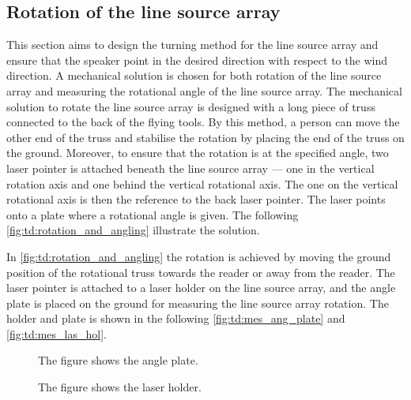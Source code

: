 \subsection{Rotation of the line source array}
This section aims to design the turning method for the line source array and ensure that the speaker point in the desired direction with respect to the wind direction. A mechanical solution is chosen for both rotation of the line source array and measuring the rotational angle of the line source array. The mechanical solution to rotate the line source array is designed with a long piece of truss connected to the back of the flying tools. By this method, a person can move the other end of the truss and stabilise the rotation by placing the end of the truss on the ground. Moreover, to ensure that the rotation is at the specified angle, two laser pointer is attached beneath the line source array — one in the vertical rotation axis and one behind the vertical rotational axis. The one on the vertical rotational axis is then the reference to the back laser pointer. The laser points onto a plate where a rotational angle is given. The following \autoref{fig:td:rotation_and_angling} illustrate the solution.


In \autoref{fig:td:rotation_and_angling} the rotation is achieved by moving the ground position of the rotational truss towards the reader or away from the reader. The laser pointer is attached to a laser holder on the line source array, and the angle plate is placed on the ground for measuring the line source array rotation. The holder and plate is shown in the following \autoref{fig:td:mes_ang_plate} and \autoref{fig:td:mes_las_hol}.


\begin{figure}[H]
    \centering
     \captionsetup{width=1\linewidth}
    \begin{minipage}{0.36\textwidth}
        \centering
         \captionsetup{width=0.90\linewidth}
       
        \caption{The figure shows the angle plate.}
        \label{fig:td:mes_ang_plate}
    \end{minipage}%
    \begin{minipage}{0.56\textwidth}
        \centering
         \captionsetup{width=0.90\linewidth}
        
        \caption{The figure shows the laser holder.}
        \label{fig:td:mes_las_hol}
    \end{minipage}
\end{figure}


